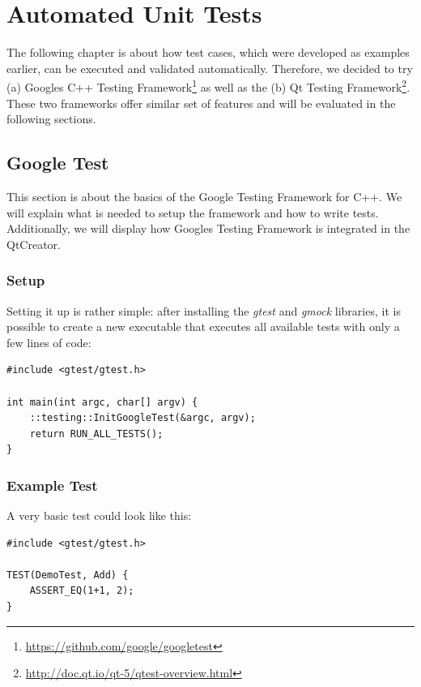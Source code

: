 \documentclass{scrreprt}
\begin{document}
\section{Automated Unit Tests}

The following chapter is about how test cases, which were developed as examples earlier, can be executed and validated automatically. Therefore, we decided to try (a) Googles C++ Testing Framework\footnote{\url{https://github.com/google/googletest}} as well as the (b) Qt Testing Framework\footnote{\url{http://doc.qt.io/qt-5/qtest-overview.html}}. These two frameworks offer similar set of features and will be evaluated in the following sections.

\subsection{Google Test}

This section is about the basics of the Google Testing Framework for C++. We will explain what is needed to setup the framework and how to write tests. Additionally, we will display how Googles Testing Framework is integrated in the QtCreator.

\subsubsection{Setup}

Setting it up is rather simple: after installing the \textit{gtest} and \textit{gmock} libraries, it is possible to create a new executable that executes all available tests with only a few lines of code:

\bigskip
\begin{lstlisting}[title=tests-google/main.cpp]
#include <gtest/gtest.h>

int main(int argc, char[] argv) {
	::testing::InitGoogleTest(&argc, argv);
	return RUN_ALL_TESTS();
}
\end{lstlisting}
\bigskip

\subsubsection{Example Test}

A very basic test could look like this:

\bigskip
\begin{lstlisting}[title=tests-google/Demo.cpp]
#include <gtest/gtest.h>

TEST(DemoTest, Add) {
	ASSERT_EQ(1+1, 2);
}
\end{lstlisting}
\bigskip
\end{document}

